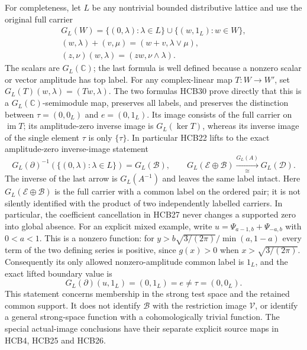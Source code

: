 \documentclass[11pt]{article}
\begin{document}
For completeness, let $L$ be any nontrivial bounded distributive
lattice and use the original full carrier
\begin{equation}\tag{HCB30}\begin{gathered}
 G_L(W)=\{(0,\lambda):\lambda\in L\}
              \cup\{(w,1_L):w\in W\},\\
 (w,\lambda)+(v,\mu)=(w+v,\lambda\vee\mu),\\
 (z,\nu)(w,\lambda)=(zw,\nu\wedge\lambda).
\end{gathered}
\end{equation}
The scalars are $G_L(\mathbb C)$; the last formula is well defined
because a nonzero scalar or vector amplitude has top label.
For any complex-linear map $T:W\to W'$, set
$G_L(T)(w,\lambda)=(Tw,\lambda)$. The two formulas HCB30 prove
directly that this is a $G_L(\mathbb C)$-semimodule map, preserves
all labels, and preserves the distinction between
$\tau=(0,0_L)$ and $e=(0,1_L)$. Its image consists of the full
carrier on $\operatorname{im}T$; its amplitude-zero inverse image
is $G_L(\ker T)$, whereas its inverse image of the single element
$\tau$ is only $\{\tau\}$. In particular HCB22 lifts to the exact
amplitude-zero inverse-image statement
\begin{equation}\tag{HCB31}
 G_L(\partial)^{-1}(\{(0,\lambda):\lambda\in L\})
       =G_L(\mathcal B),\qquad
 G_L(\mathcal E\oplus\mathcal B)
       \xrightarrow[\cong]{G_L(A)}G_L(\mathcal D).
\end{equation}
The inverse of the last arrow is $G_L(A^{-1})$ and leaves the same
label intact. Here $G_L(\mathcal E\oplus\mathcal B)$ is the full
carrier with a common label on the ordered pair; it is not silently
identified with the product of two independently labelled carriers.
In particular, the coefficient cancellation in HCB27 never changes
a supported zero into global absence.
For an explicit mixed example, write
$u=\Psi_{a-1,b}+\Psi_{-a,b}$ with $0<a<1$. This is a nonzero
function: for
$y>b\sqrt{3/(2\pi)}/\min(a,1-a)$ every term of the two defining
series is positive, since $g(x)>0$ when $x>\sqrt{3/(2\pi)}$.
Consequently its only allowed nonzero-amplitude common label is
$1_L$, and the exact lifted boundary value is
\begin{equation}\tag{HCB32}
 G_L(\partial)(u,1_L)=(0,1_L)=e\ne\tau=(0,0_L).
\end{equation}
This statement concerns membership in the strong test space and
the retained common support. It does not identify $\mathcal B$
with the restriction image $\mathcal V$, or identify a general
strong-space function with a cohomologically trivial function.
The special actual-image conclusions have their separate explicit
source maps in HCB4, HCB25 and HCB26.
\end{document}
